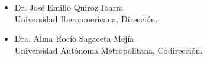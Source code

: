\begin{itemize}
	\item Dr. José Emilio Quiroz Ibarra\\
	Universidad Iberoamericana, Dirección.
	\item Dra. Alma Rocío Sagaceta Mejía\\
	Universidad Autónoma Metropolitana, Codirección.
\end{itemize}